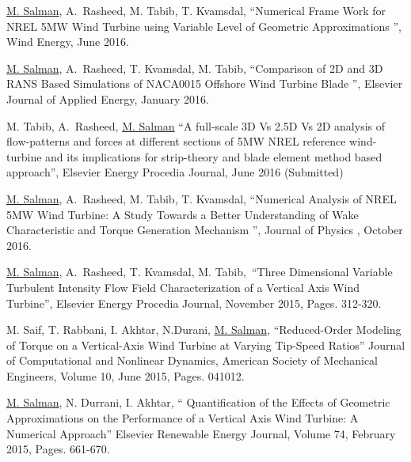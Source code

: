 

\begin{cventries}

  \cventry
    {} %
    {} %
    {} %
    {} %
    {
      \begin{cvitems} %
\item{\underline{M. Salman}, A. Rasheed, M. Tabib, T.  Kvamsdal,  “Numerical Frame Work for NREL 5MW Wind Turbine using Variable Level of Geometric Approximations  ”, Wind Energy, June 2016.}
\item{\underline{M. Salman}, A. Rasheed, T.  Kvamsdal, M. Tabib, “Comparison of 2D and 3D RANS Based Simulations of NACA0015 Offshore Wind Turbine Blade  ”, Elsevier Journal of Applied Energy, January 2016.}
\item{M. Tabib, A. Rasheed, \underline{M. Salman} “A full-scale 3D Vs 2.5D Vs 2D analysis of flow-patterns and forces at different sections of 5MW NREL reference wind-turbine and its implications for strip-theory and blade element method based approach”, Elsevier Energy Procedia Journal, June 2016 (Submitted)} 
\item{\underline{M. Salman}, A. Rasheed, M. Tabib, T.  Kvamsdal, “Numerical Analysis of NREL 5MW Wind Turbine: A Study Towards a Better Understanding of Wake Characteristic and Torque Generation Mechanism  ”, Journal of Physics , October 2016.}
\item {\underline{M. Salman}, A. Rasheed, T.  Kvamsdal, M. Tabib, “Three Dimensional Variable Turbulent Intensity Flow Field Characterization of a Vertical Axis Wind Turbine”, Elsevier Energy Procedia Journal, November 2015, Pages. 312-320.}
\item {M. Saif, T. Rabbani, I. Akhtar, N.Durani, \underline{M. Salman}, “Reduced-Order Modeling of Torque on a Vertical-Axis Wind Turbine at Varying Tip-Speed Ratios” Journal of Computational and Nonlinear Dynamics, American Society of Mechanical Engineers, Volume 10, June 2015, Pages. 041012.}\item {\underline{M. Salman}, N.  Durrani, I. Akhtar, “ Quantification of the Effects of Geometric Approximations on the Performance of a Vertical Axis Wind Turbine: A Numerical Approach” Elsevier Renewable Energy Journal, Volume 74, February 2015, Pages. 661-670.}
      \end{cvitems}
    }


\end{cventries}
